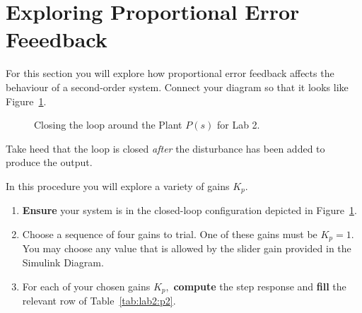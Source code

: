 \section{Exploring Proportional Error Feeedback}
For this section you will explore how proportional error feedback affects
the behaviour of a second-order system. Connect your diagram so that it
looks like Figure~\ref{fig:lab2:closing-loop}.
%
\begin{figure}
  \centering
  \caption{
    Closing the loop around the Plant \(P(s)\) for Lab 2.
  }
  \label{fig:lab2:closing-loop}
\end{figure}
%
Take heed that the loop is closed \emph{after} the disturbance has been
added to produce the output.
%
\begin{procedure}[label={proc:lab2:p2}]
  In this procedure you will explore a variety of gains \(K_p.\)
  \begin{enumerate}[label=(\arabic*)]
    \item{
      \textbf{Ensure} your system is in the closed-loop configuration
      depicted in Figure~\ref{fig:lab2:closing-loop}.
    }
    \item{
      Choose a sequence of four gains to trial. One of these gains
      must be \(K_p = 1.\) You may choose any value that is allowed by
      the slider gain provided in the Simulink Diagram.
    }
    \item{
      For each of your chosen gains \(K_p,\) \textbf{compute} the step
      response and \textbf{fill} the relevant row of Table~\ref{tab:lab2:p2}.
    }
  \end{enumerate}
\end{procedure}
